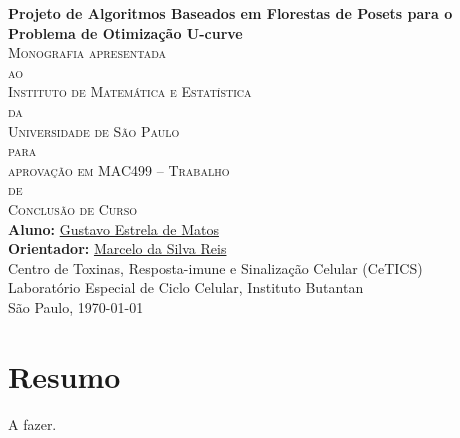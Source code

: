 \documentclass[12pt, twoside]{report}
\numberwithin{mydefinition}{section}
\numberwithin{mytheorem}{section}
\numberwithin{mylemma}{section}
\begin{document}
\thispagestyle{empty}
\begin{center}
{\Large
{\bf Projeto de Algoritmos Baseados em Florestas de Posets para o 
     Problema de Otimização U-curve}\\
\bigskip
\bigskip
\bigskip
\textsc{
    Monografia apresentada\\[-0.25cm] 
    ao\\[-0.25cm]
    Instituto de Matemática e Estatística\\[-0.25cm]
    da\\[-0.25cm]
    Universidade de São Paulo\\[-0.25cm]
    para\\[-0.25cm]
    aprovação em MAC499 -- Trabalho\\[-0.25cm]
    de\\[-0.25cm]
    Conclusão de Curso}\\
\bigskip
\bigskip
\bigskip
{\bf Aluno:} \href{mailto:gustavo.estrela.matos@gmail.com}{Gustavo Estrela de Matos}\\
\bigskip
{\bf Orientador:} \href{mailto:marcelo.reis@butantan.gov.br}{Marcelo da Silva Reis}\\
\bigskip
\bigskip
\bigskip
Centro de Toxinas, Resposta-imune e Sinalização Celular (CeTICS)\\
\bigskip
Laboratório Especial de Ciclo Celular, Instituto Butantan\\
\bigskip
\bigskip
\bigskip
São Paulo, \today
}
\end{center}
\newpage

\chapter*{Resumo}
A fazer.
\end{document}
